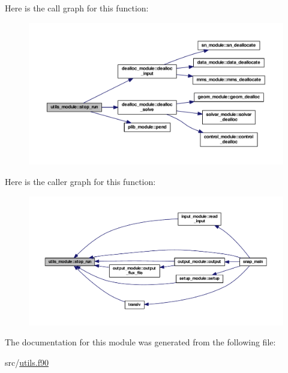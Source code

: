 Here is the call graph for this function\-:\nopagebreak
\begin{figure}[H]
\begin{center}
\leavevmode
\includegraphics[width=350pt]{classutils__module_a0566fadf7a2baadac1db54851c3045d9_cgraph}
\end{center}
\end{figure}




Here is the caller graph for this function\-:\nopagebreak
\begin{figure}[H]
\begin{center}
\leavevmode
\includegraphics[width=350pt]{classutils__module_a0566fadf7a2baadac1db54851c3045d9_icgraph}
\end{center}
\end{figure}




The documentation for this module was generated from the following file\-:\begin{DoxyCompactItemize}
\item 
src/\hyperlink{utils_8f90}{utils.\-f90}\end{DoxyCompactItemize}
